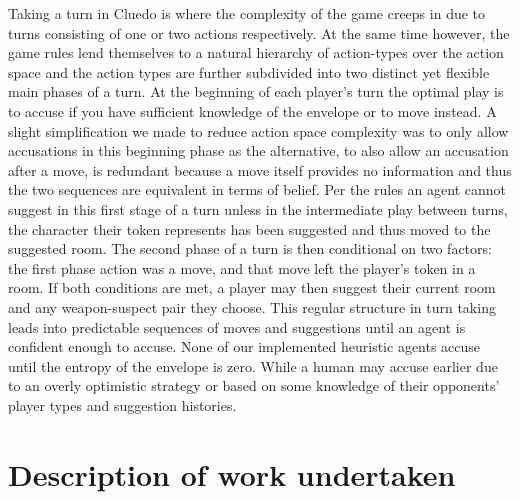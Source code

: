 \documentclass[msc, deptreport, ai, romanprepages]{infthesis}
\begin{document}
Taking a turn in Cluedo is where the complexity of the game creeps in due to turns consisting of one or two actions respectively. At the same time however, the game rules lend themselves to a natural hierarchy of action-types over the action space and the action types are further subdivided into two distinct yet flexible main phases of a turn. At the beginning of each player’s turn the optimal play is to accuse if you have sufficient knowledge of the envelope or to move instead. A slight simplification we made to reduce action space complexity was to only allow accusations in this beginning phase as the alternative, to also allow an accusation after a move, is redundant because a move itself provides no information and thus the two sequences are equivalent in terms of belief. Per the rules an agent cannot suggest in this first stage of a turn unless in the intermediate play between turns, the character their token represents has been suggested and thus moved to the suggested room. The second phase of a turn is then conditional on two factors: the first phase action was a move, and that move left the player’s token in a room. If both conditions are met, a player may then suggest their current room and any weapon-suspect pair they choose. This regular structure in turn taking leads into predictable sequences of moves and suggestions until an agent is confident enough to accuse. None of our implemented heuristic agents accuse until the entropy of the envelope is zero. While a human may accuse earlier due to an overly optimistic strategy or based on some knowledge of their opponents’ player types and suggestion histories. 

\chapter{Description of work undertaken}
\end{document}
